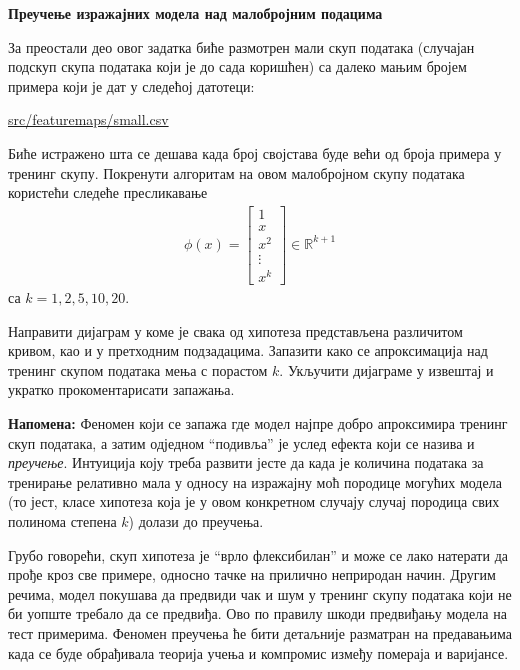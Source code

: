 \item {} {\bf Преучење изражајних модела над малобројним подацима}

За преостали део овог задатка биће размотрен мали скуп података (случајан подскуп скупа података који је до сада коришћен) са далеко мањим бројем примера који је дат у следећој датотеци:
%
\begin{center}
	\url{src/featuremaps/small.csv}
\end{center}
%

Биће истражено шта се дешава када број својстава буде већи од броја примера у тренинг скупу. Покренути алгоритам на овом малобројном скупу података користећи следеће пресликавање
\begin{align}
\phi(x) = \left[\begin{array}{c} 1\\ x \\ x^2\\ \vdots \\x^k \end{array}\right]\in \mathbb{R}^{k+1} 
\end{align}
са $k = 1,2,5,10,20$. 

Направити дијаграм у коме је свака од хипотеза представљена различитом кривом, као и у претходним подзадацима. Запазити како се апроксимација над тренинг скупом података мења с порастом $k$. Укључити дијаграме у извештај и укратко прокоментарисати запажања.

\textbf{Напомена:} Феномен који се запажа где модел најпре добро апроксимира тренинг скуп података, а затим одједном ``подивља'' је услед ефекта који се назива и \emph{преучење}. Интуиција коју треба развити јесте да када је количина података за тренирање релативно мала у односу на изражајну моћ породице могућих модела (то јест, класе хипотеза која је у овом конкретном случају случај породица свих полинома степена $k$) долази до преучења.

Грубо говорећи, скуп хипотеза је ``врло флексибилан'' и може се лако натерати да прође кроз све примере, односно тачке на прилично неприродан начин. Другим речима, модел покушава да предвиди чак и шум у тренинг скупу података који не би уопште требало да се предвиђа. Ово по правилу шкоди предвиђању модела на тест примерима. Феномен преучења ће бити детаљније разматран на предавањима када се буде обрађивала теорија учења и компромис између помераја и варијансе.


